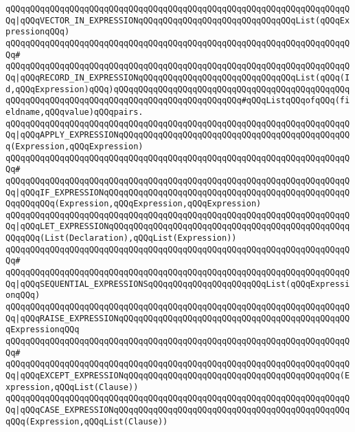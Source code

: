\verb|qQQqqQQqqQQqqQQqqQQqqQQqqQQqqQQqqQQqqQQqqQQqqQQqqQQqqQQqqQQqqQQqqQQqqQQq|\verb#|qQQqVECTOR_IN_EXPRESSIONqQQqqQQqqQQqqQQqqQQqqQQqqQQqqQQqList(qQQqExpressionqQQq)#\newline
\verb|qQQqqQQqqQQqqQQqqQQqqQQqqQQqqQQqqQQqqQQqqQQqqQQqqQQqqQQqqQQqqQQqqQQqqQQq#|\newline
\verb|qQQqqQQqqQQqqQQqqQQqqQQqqQQqqQQqqQQqqQQqqQQqqQQqqQQqqQQqqQQqqQQqqQQqqQQq|\verb#|qQQqRECORD_IN_EXPRESSIONqQQqqQQqqQQqqQQqqQQqqQQqqQQqqQQqList(qQQq(Id,qQQqExpression)qQQq)qQQqqQQqqQQqqQQqqQQqqQQqqQQqqQQqqQQqqQQqqQQqqQQqqQQqqQQqqQQqqQQqqQQqqQQqqQQqqQQqqQQqqQQqqQQqqQQq#\verb|#qQQqListqQQqofqQQq(fieldname,qQQqvalue)qQQqpairs.|\newline
\verb|qQQqqQQqqQQqqQQqqQQqqQQqqQQqqQQqqQQqqQQqqQQqqQQqqQQqqQQqqQQqqQQqqQQqqQQq|\verb#|qQQqAPPLY_EXPRESSIONqQQqqQQqqQQqqQQqqQQqqQQqqQQqqQQqqQQqqQQqqQQqqQQq(Expression,qQQqExpression)#\newline
\verb|qQQqqQQqqQQqqQQqqQQqqQQqqQQqqQQqqQQqqQQqqQQqqQQqqQQqqQQqqQQqqQQqqQQqqQQq#|\newline
\verb|qQQqqQQqqQQqqQQqqQQqqQQqqQQqqQQqqQQqqQQqqQQqqQQqqQQqqQQqqQQqqQQqqQQqqQQq|\verb#|qQQqIF_EXPRESSIONqQQqqQQqqQQqqQQqqQQqqQQqqQQqqQQqqQQqqQQqqQQqqQQqqQQqqQQqqQQq(Expression,qQQqExpression,qQQqExpression)#\newline
\verb|qQQqqQQqqQQqqQQqqQQqqQQqqQQqqQQqqQQqqQQqqQQqqQQqqQQqqQQqqQQqqQQqqQQqqQQq|\verb#|qQQqLET_EXPRESSIONqQQqqQQqqQQqqQQqqQQqqQQqqQQqqQQqqQQqqQQqqQQqqQQqqQQqqQQq(List(Declaration),qQQqList(Expression))#\newline
\verb|qQQqqQQqqQQqqQQqqQQqqQQqqQQqqQQqqQQqqQQqqQQqqQQqqQQqqQQqqQQqqQQqqQQqqQQq#|\newline
\verb|qQQqqQQqqQQqqQQqqQQqqQQqqQQqqQQqqQQqqQQqqQQqqQQqqQQqqQQqqQQqqQQqqQQqqQQq|\verb#|qQQqSEQUENTIAL_EXPRESSIONSqQQqqQQqqQQqqQQqqQQqqQQqList(qQQqExpressionqQQq)#\newline
\verb|qQQqqQQqqQQqqQQqqQQqqQQqqQQqqQQqqQQqqQQqqQQqqQQqqQQqqQQqqQQqqQQqqQQqqQQq|\verb#|qQQqRAISE_EXPRESSIONqQQqqQQqqQQqqQQqqQQqqQQqqQQqqQQqqQQqqQQqqQQqqQQqExpressionqQQq#\newline
\verb|qQQqqQQqqQQqqQQqqQQqqQQqqQQqqQQqqQQqqQQqqQQqqQQqqQQqqQQqqQQqqQQqqQQqqQQq#|\newline
\verb|qQQqqQQqqQQqqQQqqQQqqQQqqQQqqQQqqQQqqQQqqQQqqQQqqQQqqQQqqQQqqQQqqQQqqQQq|\verb#|qQQqEXCEPT_EXPRESSIONqQQqqQQqqQQqqQQqqQQqqQQqqQQqqQQqqQQqqQQqqQQq(Expression,qQQqList(Clause))#\newline
\verb|qQQqqQQqqQQqqQQqqQQqqQQqqQQqqQQqqQQqqQQqqQQqqQQqqQQqqQQqqQQqqQQqqQQqqQQq|\verb#|qQQqCASE_EXPRESSIONqQQqqQQqqQQqqQQqqQQqqQQqqQQqqQQqqQQqqQQqqQQqqQQqqQQq(Expression,qQQqList(Clause))#\newline
